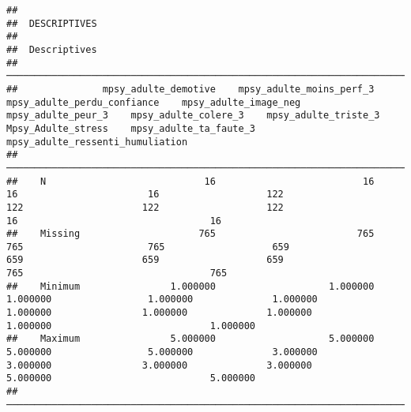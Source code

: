 \documentclass[
]{article}
\begin{document}
\begin{verbatim}
## 
##  DESCRIPTIVES
## 
##  Descriptives                                                                                                                                                                                                                                                                      
##  ───────────────────────────────────────────────────────────────────────────────────────────────────────────────────────────────────────────────────────────────────────────────────────────────────────────────────────────────────────────────────────────────────────────────── 
##               mpsy_adulte_demotive    mpsy_adulte_moins_perf_3    mpsy_adulte_perdu_confiance    mpsy_adulte_image_neg    mpsy_adulte_peur_3    mpsy_adulte_colere_3    mpsy_adulte_triste_3    Mpsy_Adulte_stress    mpsy_adulte_ta_faute_3    mpsy_adulte_ressenti_humuliation   
##  ───────────────────────────────────────────────────────────────────────────────────────────────────────────────────────────────────────────────────────────────────────────────────────────────────────────────────────────────────────────────────────────────────────────────── 
##    N                            16                          16                             16                       16                   122                     122                     122                   122                        16                                  16   
##    Missing                     765                         765                            765                      765                   659                     659                     659                   659                       765                                 765   
##    Minimum                1.000000                    1.000000                       1.000000                 1.000000              1.000000                1.000000                1.000000              1.000000                  1.000000                            1.000000   
##    Maximum                5.000000                    5.000000                       5.000000                 5.000000              3.000000                3.000000                3.000000              3.000000                  5.000000                            5.000000   
##  ─────────────────────────────────────────────────────────────────────────────────────────────────────────────────────────────────────────────────────────────────────────────────────────────────────────────────────────────────────────────────────────────────────────────────
\end{verbatim}
\end{document}
